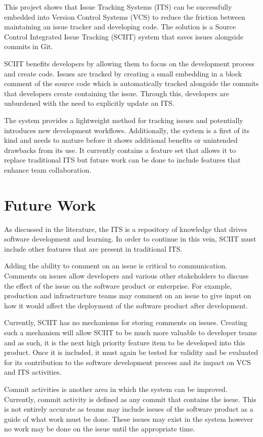 \documentclass{mproj}
\begin{document}
This project shows that Issue Tracking Systems (ITS) can be successfully embedded into Version Control Systems (VCS) to reduce the friction between maintaining an issue tracker and developing code. The solution is a Source Control Integrated Issue Tracking (SCIIT) system that saves issues alongside commits in Git.

SCIIT benefits developers by allowing them to focus on the development process and create code. Issues are tracked by creating a small embedding in a block comment of the source code which is automatically tracked alongside the commits that developers create containing the issue. Through this, developers are unburdened with the need to explicitly update an ITS.

The system provides a lightweight method for tracking issues and potentially introduces new development workflows. Additionally, the system is a first of its kind and needs to mature before it shows additional benefits or unintended drawbacks from its use. It currently contains a feature set that allows it to replace traditional ITS but future work can be done to include features that enhance team collaboration.

\section{Future Work}

As discussed in the literature, the ITS is a repository of knowledge that drives software development and learning. In order to continue in this vein, SCIIT must include other features that are present in traditional ITS.

Adding the ability to comment on an issue is critical to communication. Comments on issues allow developers and various other stakeholders to discuss the effect of the issue on the software product or enterprise. For example, production and infrastructure teams may comment on an issue to give input on how it would affect the deployment of the software product after development.

Currently, SCIIT has no mechanisms for storing comments on issues. Creating such a mechanism will allow SCIIT to be much more valuable to developer teams and as such, it is the next high priority feature item to be developed into this product. Once it is included, it must again be tested for validity and be evaluated for its contribution to the software development process and its impact on VCS and ITS activities.

Commit activities is another area in which the system can be improved. Currently, commit activity is defined as any commit that contains the issue. This is not entirely accurate as teams may include issues of the software product as a guide of what work must be done. These issues may exist in the system however no work may be done on the issue until the appropriate time.
\end{document}
